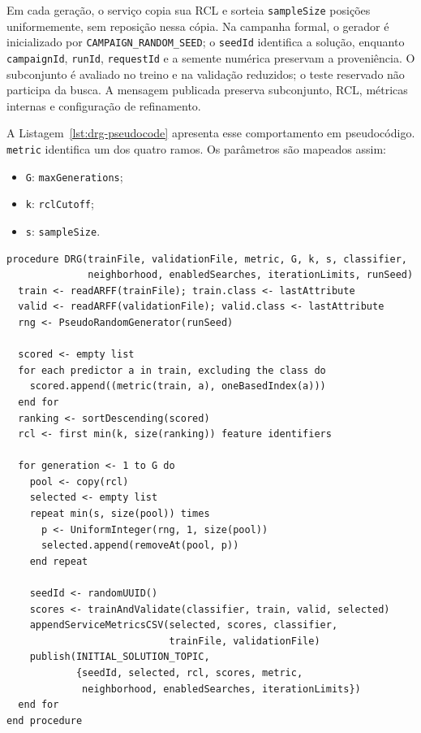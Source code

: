 Em cada geração, o serviço copia sua RCL e sorteia \texttt{sampleSize} posições uniformemente, sem reposição nessa cópia. Na campanha formal, o gerador é inicializado por \texttt{CAMPAIGN\_RANDOM\_SEED}; o \texttt{seedId} identifica a solução, enquanto \texttt{campaignId}, \texttt{runId}, \texttt{requestId} e a semente numérica preservam a proveniência. O subconjunto é avaliado no treino e na validação reduzidos; o teste reservado não participa da busca. A mensagem publicada preserva subconjunto, RCL, métricas internas e configuração de refinamento.

A Listagem~\ref{lst:drg-pseudocode} apresenta esse comportamento em pseudocódigo. \texttt{metric} identifica um dos quatro ramos. Os parâmetros são mapeados assim:
\begin{itemize}
  \item \texttt{G}: \texttt{maxGenerations};
  \item \texttt{k}: \texttt{rclCutoff};
  \item \texttt{s}: \texttt{sampleSize}.
\end{itemize}

\begin{lstlisting}[caption={Formação da RCL e construção aleatória implementadas no DRG.},label={lst:drg-pseudocode},basicstyle=\ttfamily\small,breaklines=true,columns=fullflexible]
procedure DRG(trainFile, validationFile, metric, G, k, s, classifier,
              neighborhood, enabledSearches, iterationLimits, runSeed)
  train <- readARFF(trainFile); train.class <- lastAttribute
  valid <- readARFF(validationFile); valid.class <- lastAttribute
  rng <- PseudoRandomGenerator(runSeed)

  scored <- empty list
  for each predictor a in train, excluding the class do
    scored.append((metric(train, a), oneBasedIndex(a)))
  end for
  ranking <- sortDescending(scored)
  rcl <- first min(k, size(ranking)) feature identifiers

  for generation <- 1 to G do
    pool <- copy(rcl)
    selected <- empty list
    repeat min(s, size(pool)) times
      p <- UniformInteger(rng, 1, size(pool))
      selected.append(removeAt(pool, p))
    end repeat

    seedId <- randomUUID()
    scores <- trainAndValidate(classifier, train, valid, selected)
    appendServiceMetricsCSV(selected, scores, classifier,
                            trainFile, validationFile)
    publish(INITIAL_SOLUTION_TOPIC,
            {seedId, selected, rcl, scores, metric,
             neighborhood, enabledSearches, iterationLimits})
  end for
end procedure
\end{lstlisting}

